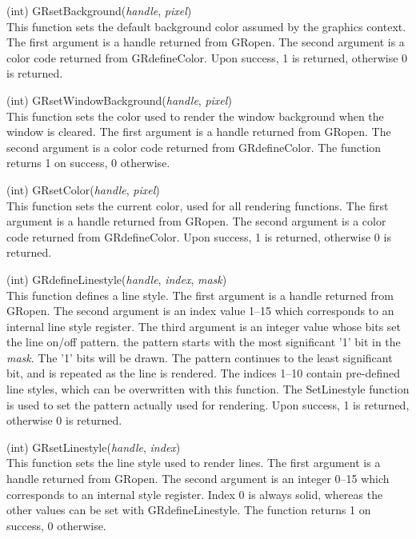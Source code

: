 \begin{description}
\item{(int) \vt GRsetBackground({\it handle}, {\it pixel\/})}\\
This function sets the default background color assumed by the
graphics context.  The first argument is a handle returned from {\vt
GRopen}.  The second argument is a color code returned from {\vt
GRdefineColor}.  Upon success, 1 is returned, otherwise 0 is returned.

\item{(int) \vt GRsetWindowBackground({\it handle}, {\it pixel\/})}\\
This function sets the color used to render the window background when
the window is cleared.  The first argument is a handle returned from
{\vt GRopen}.  The second argument is a color code returned from {\vt
GRdefineColor}.  The function returns 1 on success, 0 otherwise.

\item{(int) \vt GRsetColor({\it handle}, {\it pixel\/})}\\
This function sets the current color, used for all rendering
functions.  The first argument is a handle returned from {\vt GRopen}. 
The second argument is a color code returned from {\vt GRdefineColor}. 
Upon success, 1 is returned, otherwise 0 is returned.

\item{(int) \vt GRdefineLinestyle({\it handle}, {\it index},
  {\it mask\/})}\\
This function defines a line style.  The first argument is a handle
returned from {\vt GRopen}.  The second argument is an index value
1--15 which corresponds to an internal line style register.  The third
argument is an integer value whose bits set the line on/off pattern. 
the pattern starts with the most significant '1' bit in the {\it
mask}.  The '1' bits will be drawn.  The pattern continues to the
least significant bit, and is repeated as the line is rendered.  The
indices 1--10 contain pre-defined line styles, which can be
overwritten with this function.  The {\vt SetLinestyle} function is
used to set the pattern actually used for rendering.  Upon success, 1
is returned, otherwise 0 is returned.

\item{(int) \vt GRsetLinestyle({\it handle}, {\it index\/})}\\
This function sets the line style used to render lines.  The first
argument is a handle returned from {\vt GRopen}.  The second argument
is an integer 0--15 which corresponds to an internal style register. 
Index 0 is always solid, whereas the other values can be set with {\vt
GRdefineLinestyle}.  The function returns 1 on success, 0 otherwise.


\end{description}
